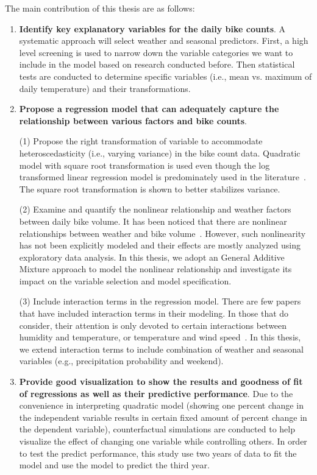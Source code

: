 \documentclass [11pt, proquest] {uwthesis}[2015/03/03]
\begin{document}
The main contribution of this thesis are as follows:
\begin{enumerate}
\item \textbf{Identify key explanatory variables for the daily bike counts}. A systematic approach will select weather and seasonal predictors. First, a high level screening is used to narrow down the variable categories we want to include in the model based on research conducted before. Then statistical tests are conducted to determine specific variables (i.e., mean vs. maximum of daily temperature) and their transformations.
\item \textbf{Propose a regression model that can adequately capture the relationship between various factors and bike counts}. 

(1) Propose the right transformation of variable to accommodate heteroscedasticity (i.e., varying variance) in the bike count data. Quadratic model with square root transformation is used even though the log transformed linear regression model is predominately used in the literature~\cite{Nosal:2014aa,Thomas09,Ahmed12}. The square root transformation is shown to better stabilizes variance.

(2) Examine and quantify the nonlinear relationship and weather factors between daily bike volume. It has been noticed that there are nonlinear relationships between weather and bike volume~\cite{Ahmed12,Miranda-Moreno:2011aa,Thomas12,Lewin:2011aa}. However, such nonlinearity has not been explicitly modeled and their effects are mostly analyzed using exploratory data analysis. In this thesis, we adopt an General Additive Mixture approach to model the nonlinear relationship and investigate its impact on the variable selection and model specification.

(3) Include interaction terms in the regression model. There are few papers that have included interaction terms in their modeling. In those that do consider, their attention is only devoted to certain interactions between humidity and temperature, or temperature and wind speed~\cite{Miranda-Moreno:2011aa}. In this thesis, we extend interaction terms to include combination of weather and seasonal variables (e.g., precipitation probability and weekend).

\item \textbf{Provide good visualization to show the results and goodness of fit of regressions as well as their predictive performance}. Due to the convenience in interpreting quadratic model (showing one percent change in the independent variable results in certain fixed amount of percent change in the dependent variable), counterfactual simulations are conducted to help visualize the effect of changing one variable while controlling others. In order to test the predict performance, this study use two years of data to fit the model and use the model to predict the third year. 



\end{enumerate}
\end{document}

